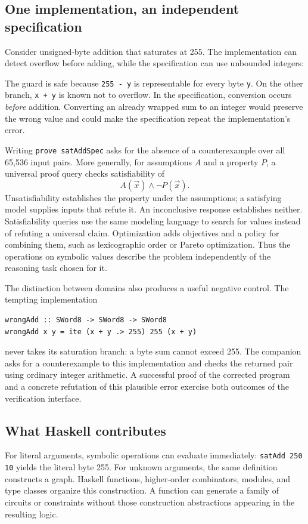 \documentclass[acmsmall,screen,nonacm]{acmart}
\newcommand{\code}[1]{\texttt{#1}}
\newcommand{\paperlisting}[1]{\par\noindent
  \begin{minipage}{\linewidth}
  
  \end{minipage}\par}
\begin{document}
\subsection{One implementation, an independent specification}

Consider unsigned-byte addition that saturates at 255. The implementation can
detect overflow before adding, while the specification can use unbounded
integers:
\paperlisting{saturating}
The guard is safe because \code{255 - y} is representable for every byte
\code{y}. On the other branch, \code{x + y} is known not to overflow.
In the specification, conversion occurs \emph{before} addition. Converting an
already wrapped sum to an integer would preserve the wrong value and could
make the specification repeat the implementation's error.

Writing \code{prove satAddSpec} asks for the absence of a counterexample over
all 65,536 input pairs. More generally, for assumptions $A$ and a property $P$,
a universal proof query checks satisfiability of
\[
             A(\vec{x}) \land \neg P(\vec{x}).
\]
Unsatisfiability establishes the property under the assumptions; a satisfying
model supplies inputs that refute it. An inconclusive response establishes
neither. Satisfiability queries use the same modeling language to search for
values instead of refuting a universal claim. Optimization adds objectives and
a policy for combining them, such as lexicographic order or Pareto optimization.
Thus the operations on symbolic values describe the problem independently of
the reasoning task chosen for it.

The distinction between domains also produces a useful negative control.
The tempting implementation
\begin{lstlisting}
wrongAdd :: SWord8 -> SWord8 -> SWord8
wrongAdd x y = ite (x + y .> 255) 255 (x + y)
\end{lstlisting}
never takes its saturation branch: a byte sum cannot exceed 255. The companion
asks for a counterexample to this implementation and checks the returned pair
using ordinary integer arithmetic. A successful proof of the corrected program
and a concrete refutation of this plausible error exercise both outcomes of the
verification interface.

\subsection{What Haskell contributes}

For literal arguments, symbolic operations can evaluate immediately:
\code{satAdd 250 10} yields the literal byte 255. For unknown arguments, the
same definition constructs a graph. Haskell functions, higher-order
combinators, modules, and type classes organize this construction. A function
can generate a family of circuits or constraints without those construction
abstractions appearing in the resulting logic.
\end{document}
